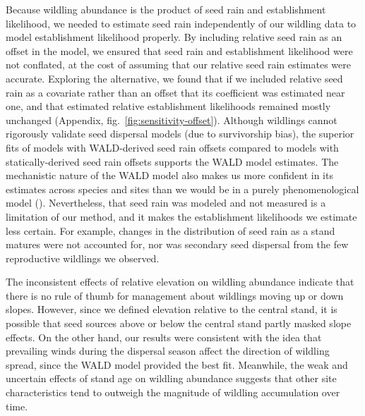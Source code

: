 \documentclass[
]{article}
\begin{document}
Because wildling abundance is the product of seed rain and establishment
likelihood, we needed to estimate seed rain independently of our wildling data
to model establishment likelihood properly. By including relative seed rain as
an offset in the model, we ensured that seed rain and establishment likelihood
were not conflated, at the cost of assuming that our relative seed rain
estimates were accurate. Exploring the alternative, we found that if we included
relative seed rain as a covariate rather than an offset that its coefficient was
estimated near one, and that estimated relative establishment likelihoods
remained mostly unchanged (Appendix, fig.~\ref{fig:sensitivity-offset}).
Although wildlings cannot rigorously validate seed dispersal models (due to
survivorship bias), the superior fits of models with WALD-derived seed rain
offsets compared to models with statically-derived seed rain offsets supports
the WALD model estimates. The mechanistic nature of the WALD model also makes us
more confident in its estimates across species and sites than we would be in a
purely phenomenological model (). Nevertheless,
that seed rain was modeled and not measured is a limitation of our method, and
it makes the establishment likelihoods we estimate less certain. For example,
changes in the distribution of seed rain as a stand matures were not accounted
for, nor was secondary seed dispersal from the few reproductive wildlings we
observed.

The inconsistent effects of relative elevation on wildling abundance indicate
that there is no rule of thumb for management about wildlings moving up or down
slopes. However, since we defined elevation relative to the central stand, it is
possible that seed sources above or below the central stand partly masked slope
effects. On the other hand, our results were consistent with the idea that
prevailing winds during the dispersal season affect the direction of wildling
spread, since the WALD model provided the best fit. Meanwhile, the weak and
uncertain effects of stand age on wildling abundance suggests that other site
characteristics tend to outweigh the magnitude of wildling accumulation over
time.
\end{document}
